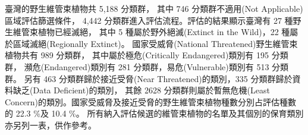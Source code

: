 
臺灣的野生維管束植物共 5,188 分類群，
其中 746 分類群不適用(Not Applicable)區域評估篩選條件，
4,442 分類群進入評估流程。評估的結果顯示臺灣有 27 種野生維管束植物已經滅絕，
其中 5 種屬於野外絕滅(Extinct in the Wild)，22 種屬於區域滅絕(Regionally Extinct)。
國家受威脅(National Threatened)野生維管束植物共有 989 分類群，
其中屬於極危(Critically Endangered)類別有 195 分類群，
瀕危(Endangered)類別有 281 分類群，易危(Vulnerable)類別有 513 分類群。
另有 463 分類群歸於接近受脅(Near Threatened)的類別，335 分類群歸於資料缺乏(Data Deficient)的類別，
其餘 2628 分類群則屬於暫無危機(Least Concern)的類別。國家受威脅及接近受脅的野生維管束植物種數分別占評估種數的 22.3 \%及 10.4 \%。
所有納入評估候選的維管束植物的名單及其個別的保育類別亦另列一表，供作參考。

